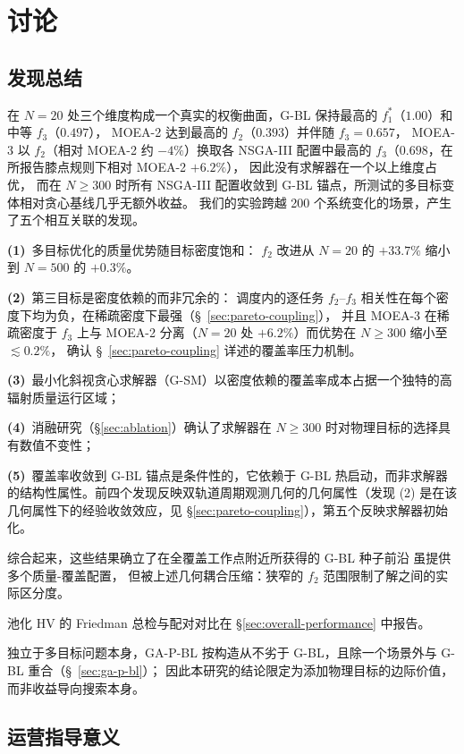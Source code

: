 \documentclass[preprint,12pt,authoryear]{elsarticle}
\begin{document}
\section{讨论}
\subsection{发现总结}
\label{sec:summary}
在 $N=20$ 处三个维度构成一个真实的权衡曲面，G-BL 保持最高的 $f_1^*$（$1.00$）和中等 $f_3$（$0.497$），
MOEA-2 达到最高的 $f_2$（$0.393$）并伴随 $f_3 = 0.657$，
MOEA-3 以 $f_2$（相对 MOEA-2 约 $-4\%$）换取各 NSGA-III 配置中最高的 $f_3$（$0.698$，在所报告膝点规则下相对 MOEA-2 $+6.2\%$），
因此没有求解器在一个以上维度占优，
而在 $N \geq 300$ 时所有 NSGA-III 配置收敛到 G-BL 锚点，所测试的多目标变体相对贪心基线几乎无额外收益。
我们的实验跨越 200 个系统变化的场景，产生了五个相互关联的发现。

\textbf{(1)}~多目标优化的质量优势随目标密度饱和：
$f_2$ 改进从 $N=20$ 的 $+33.7\%$ 缩小到 $N=500$ 的 $+0.3\%$。

\textbf{(2)}~第三目标是密度依赖的而非冗余的：
调度内的逐任务 $f_2$--$f_3$ 相关性在每个密度下均为负，在稀疏密度下最强（\S~\ref{sec:pareto-coupling}），
并且 MOEA-3 在稀疏密度于 $f_3$ 上与 MOEA-2 分离（$N=20$ 处 $+6.2\%$）而优势在 $N \geq 300$ 缩小至 $\lesssim 0.2\%$，
确认 \S~\ref{sec:pareto-coupling} 详述的覆盖率压力机制。

\textbf{(3)}~最小化斜视贪心求解器（G-SM）以密度依赖的覆盖率成本占据一个独特的高辐射质量运行区域；

\textbf{(4)}~消融研究（\S\ref{sec:ablation}）确认了求解器在 $N \geq 300$ 时对物理目标的选择具有数值不变性；

\textbf{(5)}~覆盖率收敛到 G-BL 锚点是条件性的，它依赖于 G-BL 热启动，而非求解器的结构性属性。前四个发现反映双轨道周期观测几何的几何属性（发现 (2) 是在该几何属性下的经验收敛效应，见 \S\ref{sec:pareto-coupling}），第五个反映求解器初始化。

综合起来，这些结果确立了在全覆盖工作点附近所获得的 G-BL 种子前沿
虽提供多个质量-覆盖配置，
但被上述几何耦合压缩：狭窄的 $f_2$ 范围限制了解之间的实际区分度。

池化 HV 的 Friedman 总检与配对对比在 \S\ref{sec:overall-performance} 中报告。

独立于多目标问题本身，GA-P-BL 按构造从不劣于 G-BL，且除一个场景外与 G-BL 重合（\S~\ref{sec:ga-p-bl}）；
因此本研究的结论限定为添加物理目标的边际价值，而非收益导向搜索本身。
\subsection{运营指导意义}
\label{sec:operational-implications}
\end{document}
